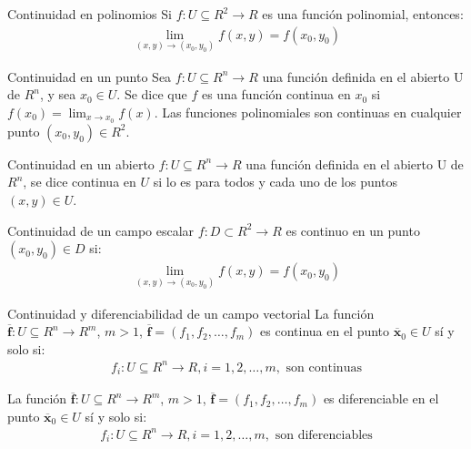 \documentclass[a4paper, twoside]{article}
\numberwithin{equation}{section}
\numberwithin{figure}{section}
\numberwithin{table}{section}
\newcommand{\vect}[1]{\overline{\textbf{#1}}}
\begin{document}
\begin{teorema*}{Continuidad en polinomios}
	Si $f:U\subseteq R^2 \rightarrow R$ es una función polinomial, entonces:
	\begin{align}
		\lim_{\left(x,y\right)\rightarrow(x_0,y_0)}f\left(x,y\right)=f(x_0,y_0)
	\end{align}
\end{teorema*}

\begin{definicion*}{Continuidad en un punto}
	Sea $f: U \subseteq R^n \rightarrow R$ una función definida en el abierto U de $R^n$, y sea $x_0 \in U.$
	Se dice que $f$ es una función continua en $x_{0}$ si $f \left( x_{0} \right) = \lim_{ x \rightarrow x_0} f(x)$.
	Las funciones polinomiales son continuas en cualquier punto $\left( x_0, y_0 \right) \in R^2$.
\end{definicion*}

\begin{definicion*}{Continuidad en un abierto}
	$f: U \subseteq R^n \rightarrow R$ una función definida en el abierto U de $R^n$, se dice continua en $U$ si lo es para todos y cada uno de los puntos $\left(x,y\right)\in U$.
\end{definicion*}

\begin{definicion*}{Continuidad de un campo escalar}
	$f:D\subset R^2 \to R$ es continuo en un punto $\left(x_0,y_0\right)\in D$ si:
	\begin{align} 
		\lim_{(x,y)\to(x_0,y_0)}f(x,y)=f(x_0,y_0)
	\end{align}
\end{definicion*}

\begin{definicion*}{Continuidad y diferenciabilidad de un campo vectorial}
	La función $\vect{f}: U \subseteq R^n \to R^m$, $m>1$, $\vect{f} = \left( f_1, f_2, \ldots, f_m \right)$ es continua en el punto $\vect{x}_0 \in U$ sí y solo si:
	\begin{align}
		f_i:U\subseteq R^n \to R, i=1,2,\ldots,m, \text{ son continuas}
	\end{align}

	La función $\vect{f}: U \subseteq R^n \to R^m$, $m>1$, $\vect{f} = \left( f_1, f_2, \ldots, f_m \right)$ es diferenciable en el punto $\vect{x}_0 \in U$ sí y solo si:
	\begin{align} 
		f_i:U\subseteq R^n \to R, i=1,2,\ldots,m, \text{ son diferenciables}
	\end{align}
\end{definicion*}
\end{document}
